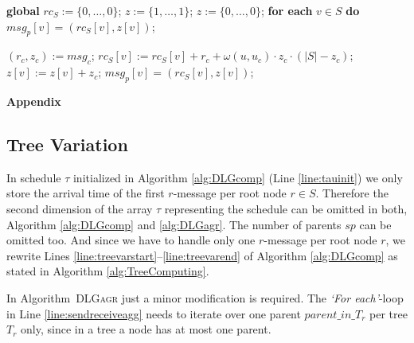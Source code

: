 \documentclass[11pt]{article}
\newif\iffull
\begin{document}
\begin{algorithm}[htb]
\begin{algorithmic}[1]
\STATE {} 
\STATE \textbf{global} $rc_{S}:=\{0,\dots,0\}$; \label{line:gmrctinitstart}
        \STATE $z:=\{1,\dots,1\}$;
\ELSE
        \STATE $z:=\{0,\dots,0\}$; 
\ENDIF \label{line:gmrctinitend}
\STATE \textbf{for each} $v\in S$ \textbf{do} $msg_p[v]=(rc_S[v], z[v])$; \label{line:gmrctinitmsg}\newline

\STATE {}
\STATE $(r_c, z_c):=msg_c$;
\STATE $rc_S[v]:=rc_S[v]+r_c+\omega(u,u_c)\cdot z_c\cdot(|S|-z_c)$;
\STATE $z[v]:=z[v]+z_c$;
\STATE $msg_p[v]=(rc_S[v], z[v])$; 
\end{algorithmic}
\caption{$\mathcal{A}_{MRCT}'()$}
\label{alg:MRCT_g}
\vspace*{0.5cm}
\end{algorithm}

\fi







\begin{center}
\textbf{Appendix}
\end{center}



\subsection{Tree Variation}\label{app:tree}

In schedule $\tau$ initialized in Algorithm \ref{alg:DLGcomp} (Line \ref{line:tauinit}) we only store the arrival time of the first $r$-message per root node $r\in S$.
Therefore the second dimension of the array $\tau$ representing the schedule can be omitted in both, Algorithm \ref{alg:DLGcomp} and \ref{alg:DLGagr}.
The number of parents $sp$ can be omitted too.
And since we have to handle only one $r$-message per root node $r$, we rewrite Lines \ref{line:treevarstart}--\ref{line:treevarend} of Algorithm \ref{alg:DLGcomp} as stated in Algorithm \ref{alg:TreeComputing}.


In Algorithm\iffull~\ref{alg:DLGagr}\fi~\textsc{DLGagr} just a minor modification is required. 
The \textit{`For each'}-loop in Line \ref{line:sendreceiveagg} needs to iterate over one parent $parent\_in\_T_r$ per tree $T_r$ only, since in a tree a node has at most one parent.
\end{document}
